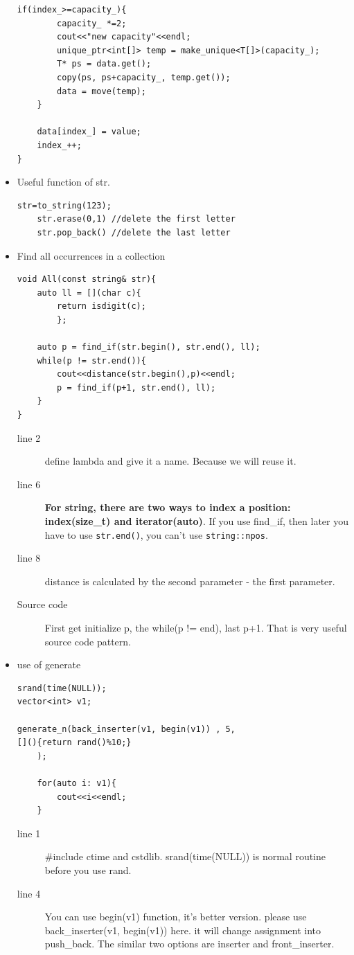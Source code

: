 \documentclass[a4paper,12pt,twoside]{book}
\begin{document}
\begin{itemize}
\begin{lstlisting}[numbers=none]
	if(index_>=capacity_){
		capacity_ *=2;
		cout<<"new capacity"<<endl;
		unique_ptr<int[]> temp = make_unique<T[]>(capacity_);
		T* ps = data.get();
		copy(ps, ps+capacity_, temp.get());
		data = move(temp);
	}
	
	data[index_] = value;
	index_++;
}
\end{lstlisting}

	
	\item Useful function of str.
\begin{lstlisting}[numbers=none]
	str=to_string(123);
	str.erase(0,1) //delete the first letter
	str.pop_back() //delete the last letter
\end{lstlisting}
	
	
	\item Find all occurrences in a collection
\begin{lstlisting}[numbers=none]
void All(const string& str){
	auto ll = [](char c){
		return isdigit(c);
		};
			
	auto p = find_if(str.begin(), str.end(), ll);
	while(p != str.end()){
		cout<<distance(str.begin(),p)<<endl;
		p = find_if(p+1, str.end(), ll);
	}
}
\end{lstlisting}
	\begin{description}
		\item[line 2] define lambda and give it a name. Because we will reuse it.
		\item[line 6] \textbf{For string, there are two ways to index a position: index(size\_t) and iterator(auto)}. If you use find\_if, then later you have to use \texttt{str.end()}, you can't use \texttt{string::npos}.
		\item[line 8] distance is calculated by the second parameter - the first parameter.
		\item[Source code] First get initialize p, the while(p != end), last p+1. That is very useful source code pattern. 
	\end{description}


\item use of generate
\begin{lstlisting}[numbers=none]
srand(time(NULL));
vector<int> v1;

generate_n(back_inserter(v1, begin(v1)) , 5,
[](){return rand()%10;} 
	);
	
	for(auto i: v1){
		cout<<i<<endl;
	}
\end{lstlisting}
\begin{description}
	\item[line 1] \#include ctime and cstdlib. srand(time(NULL)) is normal routine before you use rand.
	\item[line 4] You can use begin(v1) function, it's better version. please use back\_inserter(v1, begin(v1)) here. it will change assignment into push\_back. The similar two options are inserter and front\_inserter. 


\end{description}
\end{itemize}
\end{document}
